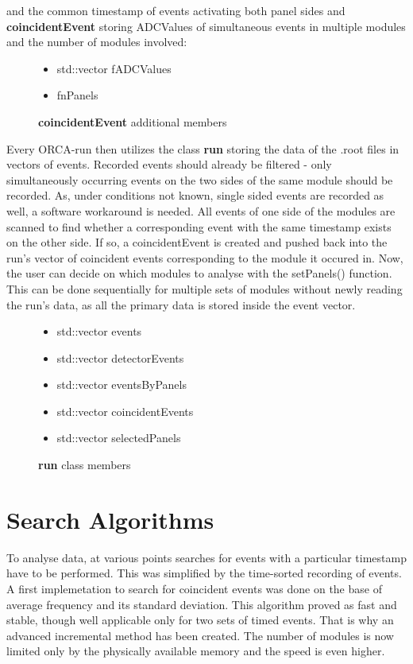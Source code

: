     and the common timestamp of events activating both panel sides and\\
    {\bf coincidentEvent} storing ADCValues of simultaneous events in multiple modules and the number of modules involved:
    \begin{figure}
      \caption*{{\bf coincidentEvent} additional members}
	\begin{itemize}
	  \item std::vector fADCValues
	  \item fnPanels
      \end{itemize}
    \end{figure}
    Every ORCA-run then utilizes the class {\bf run} storing the data of the .root files in vectors of events.
    Recorded events should already be filtered - only simultaneously occurring events on the two sides of the same module should be recorded. As, under conditions not known, single sided events are recorded as well, a software workaround is needed. All events of one side of the modules are scanned to find whether a corresponding event with the same timestamp exists on the other side. If so, a coincidentEvent is created and pushed back into the run's vector of coincident events corresponding to the module it occured in.
    Now, the user can decide on which modules to analyse with the setPanels() function. This can be done sequentially for multiple sets of modules without newly reading the run's data, as all the primary data is stored inside the event vector.
    \begin{figure}[h]
      \caption*{{\bf run} class members}
	\begin{itemize}
	  \item std::vector events
	  \item std::vector detectorEvents
	  \item std::vector eventsByPanels
	  \item std::vector coincidentEvents
	  \item std::vector selectedPanels
      \end{itemize}
    \end{figure}
    
    
  
  \section{Search Algorithms}
  \label{ch:Analysis software:sec:Search algorithms}
    To analyse data, at various points searches for events with a particular timestamp have to be performed. This was simplified by the time-sorted recording of events. A first implemetation to search for coincident events was done on the base of average frequency and its standard deviation. This algorithm proved as fast and stable, though well applicable only for two sets of timed events. That is why an advanced incremental method has been created. The number of modules is now limited only by the physically available memory and the speed is even higher.
